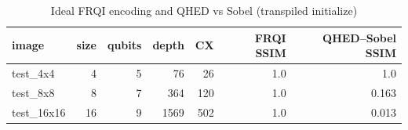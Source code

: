 
\begin{table}[htbp]
\centering
\caption{Ideal FRQI encoding and QHED vs Sobel (transpiled initialize)}
\label{tab:encoding_baseline}
\begin{tabular}{lrrrrrr}
\toprule
image & size & qubits & depth & CX & FRQI SSIM & QHED--Sobel SSIM \\
\midrule
test\_4x4 & 4 & 5 & 76 & 26 & 1.0 & 1.0 \\
test\_8x8 & 8 & 7 & 364 & 120 & 1.0 & 0.163 \\
test\_16x16 & 16 & 9 & 1569 & 502 & 1.0 & 0.013 \\
\bottomrule
\end{tabular}
\end{table}
